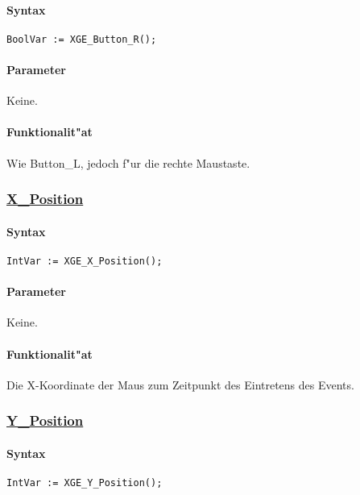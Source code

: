 \paragraph{Syntax}
\begin{verbatim}
BoolVar := XGE_Button_R();
\end{verbatim}

\paragraph{Parameter}
Keine.

\paragraph{Funktionalit"at}
Wie Button\_L, jedoch f"ur die rechte Maustaste.


\subsubsection{\underline{X\_Position}}

\paragraph{Syntax}
\begin{verbatim}
IntVar := XGE_X_Position();
\end{verbatim}

\paragraph{Parameter}
Keine.

\paragraph{Funktionalit"at}
Die X-Koordinate der Maus zum Zeitpunkt des Eintretens des Events.


\subsubsection{\underline{Y\_Position}}

\paragraph{Syntax}
\begin{verbatim}
IntVar := XGE_Y_Position();
\end{verbatim}

